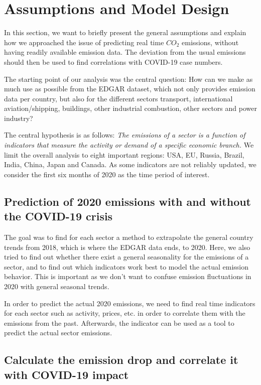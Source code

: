 \section{Assumptions and Model Design}

In this section, we want to briefly present the general assumptions and explain how we approached the issue of predicting real time $CO_2$ emissions, without having readily available emission data. The deviation from the usual emissions should then be used to find correlations with COVID-19 case numbers.%

The starting point of our analysis was the central question: How can we make as much use as possible from the EDGAR %
dataset, which not only provides emission data per country, but also for the different sectors transport, international aviation/shipping, buildings, other industrial combustion, other sectors and power industry? 

The central hypothesis is as follows: \emph{The emissions of a sector is a function of indicators that measure the activity or demand of a specific economic branch.} We limit the overall analysis to eight important regions: USA, EU, Russia, Brazil, India, China, Japan and Canada. As some indicators are not reliably updated, we consider the first six months of 2020 as the time period of interest.

\subsection{Prediction of 2020 emissions with and without the COVID-19 crisis}

The goal was to find for each sector a method to extrapolate the general country trends from 2018, which is where the EDGAR data ends, to 2020. Here, we also tried to find out whether there exist a general seasonality for the emissions of a sector, and to find out which indicators work best to model the actual emission behavior. This is important as we don't want to confuse emission fluctuations in 2020 with general seasonal trends.

In order to predict the actual 2020 emissions, we need to find real time indicators for each sector such as activity, prices, etc. in order to correlate them with the emissions from the past. Afterwards, the indicator can be used as a tool to predict the actual sector emissions.

\subsection{Calculate the emission drop and correlate it with COVID-19 impact}

